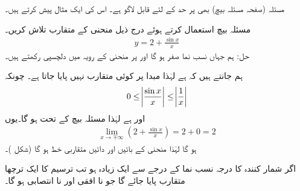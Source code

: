 مسئلہ  (صفحہ  مسئلہ بیچ) بھی  پر حد کے لئے قابل لاگو ہے۔ اس کی ایک مثال پیش کرتے ہیں۔


مسئلہ بیچ استعمال کرتے ہوئے درج ذیل منحنی کے متقارب تلاش کریں۔
\begin{align*}
y=2+\frac{\sin x}{x}
\end{align*}
حل:\quad
ہم  جہاں نسب نما صفر ہو گا اور  پر منحنی کے رویہ میں دلچسپی رکھتے ہیں۔

ہم جانتے ہیں کہ  ہے لہٰذا مبدا پر کوئی متقارب نہیں پایا جاتا ہے۔ چونکہ
\begin{align*}
0\le \abs{\frac{\sin x}{x}}\le \abs{\frac{1}{x}}
\end{align*}
اور  ہے لہٰذا مسئلہ بیچ کے تحت  ہو گا۔یوں 
\begin{align*}
\lim_{x\to \mp\infty}(2+\frac{\sin x}{x})=2+0=2
\end{align*}
ہو گا لہٰذا منحنی کے بائیں اور دائیں متقاربی خط  ہو گا (شکل )۔

اگر شمار کنندہ کا درجہ نسب نما کے درجے سے ایک زیادہ ہو تب ترسیم کا ایک ترچھا متقارب پایا جائے گا جو نا افقی اور نا انتصابی ہو گا۔

